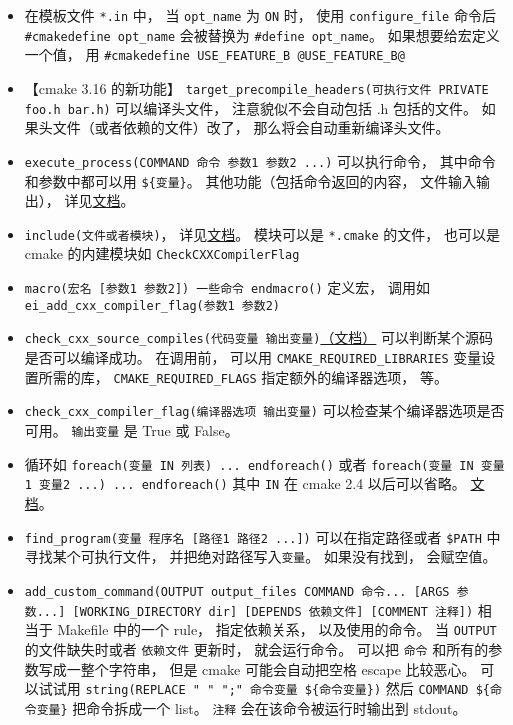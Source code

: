 \begin{itemize}
\item 在模板文件 \verb`*.in` 中， 当 \verb`opt_name` 为 \verb`ON` 时， 使用 \verb|configure_file| 命令后 \verb`#cmakedefine opt_name` 会被替换为 \verb`#define opt_name`。 如果想要给宏定义一个值， 用 \verb`#cmakedefine USE_FEATURE_B @USE_FEATURE_B@`
\item 【cmake 3.16 的新功能】 \verb|target_precompile_headers(可执行文件 PRIVATE foo.h bar.h)| 可以编译头文件， 注意貌似不会自动包括 .h 包括的文件。 如果头文件（或者依赖的文件）改了， 那么将会自动重新编译头文件。
\item \verb|execute_process(COMMAND 命令 参数1 参数2 ...)| 可以执行命令， 其中命令和参数中都可以用 \verb|${变量}|。 其他功能（包括命令返回的内容， 文件输入输出）， 详见\href{https://cmake.org/cmake/help/latest/command/execute_process.html}{文档}。
\item \verb|include(文件或者模块)|， 详见\href{https://cmake.org/cmake/help/latest/command/include.html}{文档}。 模块可以是 \verb|*.cmake| 的文件， 也可以是 cmake 的内建模块如 \verb|CheckCXXCompilerFlag|
\item \verb|macro(宏名 [参数1 参数2]) 一些命令 endmacro()| 定义宏， 调用如 \verb|ei_add_cxx_compiler_flag(参数1 参数2)|
\item \verb|check_cxx_source_compiles(代码变量 输出变量)|\href{https://cmake.org/cmake/help/latest/module/CheckCXXSourceCompiles.html}{（文档）} 可以判断某个源码是否可以编译成功。 在调用前， 可以用 \verb|CMAKE_REQUIRED_LIBRARIES| 变量设置所需的库， \verb|CMAKE_REQUIRED_FLAGS| 指定额外的编译器选项， 等。
\item \verb|check_cxx_compiler_flag(编译器选项 输出变量)| 可以检查某个编译器选项是否可用。 \verb|输出变量| 是 True 或 False。
\item 循环如 \verb|foreach(变量 IN 列表) ... endforeach()| 或者 \verb|foreach(变量 IN 变量1 变量2 ...) ... endforeach()| 其中 \verb|IN| 在 cmake 2.4 以后可以省略。 \href{https://cmake.org/cmake/help/latest/command/foreach.html}{文档}。
\item \verb|find_program(变量 程序名 [路径1 路径2 ...])| 可以在指定路径或者 \verb|$PATH| 中寻找某个可执行文件， 并把绝对路径写入\verb|变量|。 如果没有找到， 会赋空值。
\item \verb|add_custom_command(OUTPUT output_files COMMAND 命令... [ARGS 参数...] [WORKING_DIRECTORY dir] [DEPENDS 依赖文件] [COMMENT 注释])| 相当于 Makefile 中的一个 rule， 指定依赖关系， 以及使用的命令。 当 \verb|OUTPUT| 的文件缺失时或者 \verb|依赖文件| 更新时， 就会运行命令。 可以把 \verb|命令| 和所有的参数写成一整个字符串， 但是 cmake 可能会自动把空格 escape 比较恶心。 可以试试用 \verb|string(REPLACE " " ";" 命令变量 ${命令变量})| 然后 \verb|COMMAND ${命令变量}| 把命令拆成一个 list。 \verb|注释| 会在该命令被运行时输出到 stdout。

\end{itemize}
